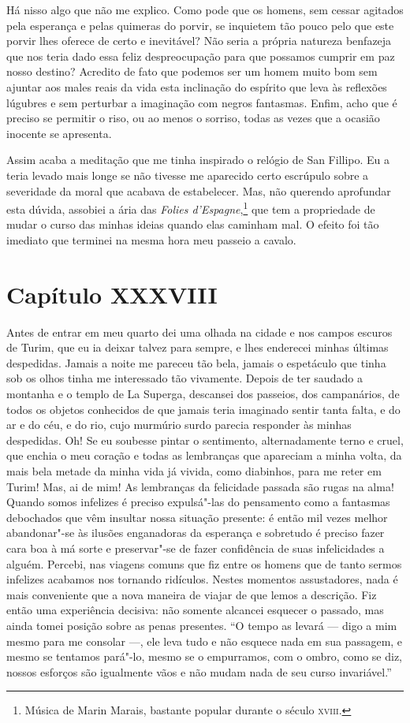 Há nisso algo que não me explico. Como pode que os homens, sem cessar
agitados pela esperança e pelas quimeras do porvir, se inquietem tão                   
pouco pelo que este porvir lhes oferece de certo e inevitável? Não
seria a própria natureza benfazeja que nos teria dado essa feliz
despreocupação para que possamos cumprir em paz nosso destino? Acredito
de fato que podemos ser um homem muito bom sem ajuntar aos males reais
da vida esta inclinação do espírito que leva às reflexões lúgubres e
sem perturbar a imaginação com negros fantasmas. Enfim, acho que é
preciso se permitir o riso, ou ao menos o sorriso, todas as vezes que a
ocasião inocente se apresenta.

Assim acaba a meditação que me tinha inspirado o relógio de San Fillipo.
Eu a teria levado mais longe se não tivesse me aparecido certo
escrúpulo sobre a severidade da moral que acabava de estabelecer. Mas,
não querendo aprofundar esta dúvida, assobiei a ária das \textit{Folies
d’Espagne},\footnote{ Música de Marin Marais, bastante
popular durante o século \textsc{xviii}.} que tem a propriedade de mudar o
curso das minhas ideias quando elas caminham mal. O efeito foi tão
imediato que terminei na mesma hora meu passeio a cavalo.

\section*{Capítulo XXXVIII}

 Antes de entrar em meu quarto dei uma olhada na cidade e nos campos
escuros de Turim, que eu ia deixar talvez para sempre, e lhes enderecei
minhas últimas despedidas. Jamais a noite me pareceu tão bela, jamais o
espetáculo que tinha sob os olhos tinha me interessado tão vivamente.
Depois de ter saudado a montanha e o templo de La Superga, descansei
dos passeios, dos campanários, de todos os objetos conhecidos de que
jamais teria imaginado sentir tanta falta, e do ar e do céu, e do rio,
cujo murmúrio surdo parecia responder às minhas despedidas. Oh! Se eu
soubesse pintar o sentimento, alternadamente terno e cruel, que enchia
o meu coração e todas as lembranças que apareciam a minha volta, da
mais bela metade da minha vida já vivida, como diabinhos, para me reter
em Turim! Mas, ai de mim! As lembranças da felicidade passada são rugas
na alma! Quando somos infelizes é preciso expulsá"-las do pensamento
como a fantasmas debochados que vêm insultar nossa situação presente: é
então mil vezes melhor abandonar"-se às ilusões enganadoras da esperança
e sobretudo é preciso fazer cara boa à má sorte e preservar"-se de fazer
confidência de suas infelicidades a alguém. Percebi, nas viagens comuns
que fiz entre os homens que de tanto sermos infelizes acabamos nos
tornando ridículos. Nestes momentos assustadores, nada é mais
conveniente que a nova maneira de viajar de que lemos a descrição. Fiz
então uma experiência decisiva: não somente alcancei esquecer o
passado, mas ainda tomei posição sobre as penas presentes. ``O tempo as
levará --- digo a mim mesmo para me consolar ---, ele leva tudo e não esquece nada
em sua passagem, e mesmo se tentamos pará"-lo, mesmo se o empurramos,
com o ombro, como se diz, nossos esforços são igualmente vãos e não
mudam nada de seu curso invariável.''

